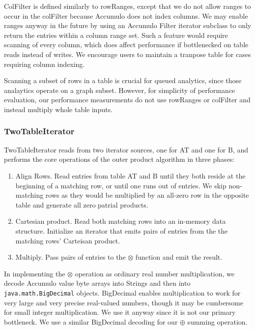 ColFilter is defined similarly to rowRanges, except that we do not allow ranges to occur in the colFilter
because Accumulo does not index columns.  We may enable ranges anyway in the future by using an Accumulo
Filter iterator subclass to only return the entries within a column range set.
Such a feature would require scanning of every column, which does affect performance if bottlenecked on 
table reads instead of writes.
We encourage users to maintain a tranpose table for cases requiring column indexing.

Scanning a subset of rows in a table is crucial for queued analytics, since those analaytics 
operate on a graph subset.  However, for simplicity of performance evaluation, 
our performance measurements do not use rowRanges or colFilter and instead multiply whole table inputs.

\subsubsection{TwoTableIterator}
TwoTableIterator reads from two iterator sources, one for AT and one for B,
and performs the core operations of the outer product algorithm in three phases:
\begin{enumerate}
\item Align Rows.  Read entries from table AT and B until they both reside at the beginning of a matching row,
or until one runs out of entries. We skip non-matching rows as they would be multiplied by an all-zero row in the
opposite table and generate all zero patrial products.
\item Cartesian product. Read both matching rows into an in-memory data structure. 
Initialize an iterator that emits pairs of entries from the the matching rows' Carteisan product.
\item Multiply. Pass pairs of entries to the $\otimes$ function and emit the result. 
\end{enumerate}

In implementing the $\otimes$ operation as ordinary real number multiplication,
we decode Accumulo value byte arrays into Strings and then into \texttt{java.math.BigDecimal}
objects. BigDecimal enables multiplication to work for very large and very precise real-valued numbers,
though it may be cumbersome for small integer multiplication. We use it anyway since it is not our
primary bottleneck.  We use a similar BigDecimal decoding for our $\oplus$ summing operation.

